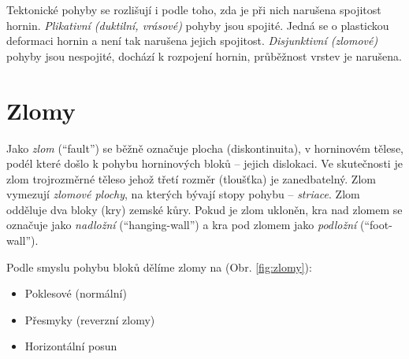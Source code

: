 Tektonické pohyby se rozlišují i podle toho, zda je při nich narušena spojitost hornin. \emph{Plikativní (duktilní, vrásové)} pohyby jsou spojité. Jedná se o plastickou deformaci hornin a není tak narušena jejich spojitost. \emph{Disjunktivní (zlomové)} pohyby jsou nespojité, dochází k rozpojení hornin, průběžnost vrstev je narušena.

\section{Zlomy}
Jako \emph{zlom} (\enquote{fault}) se běžně označuje plocha (diskontinuita), v horninovém tělese, podél které došlo k pohybu horninových bloků -- jejich dislokaci. Ve skutečnosti je zlom trojrozměrné těleso jehož třetí rozměr (tloušťka) je zanedbatelný. Zlom vymezují \emph{zlomové plochy}, na kterých bývají stopy pohybu -- \emph{striace}. Zlom odděluje dva bloky (kry) zemské kůry. Pokud je zlom ukloněn, kra nad zlomem se označuje jako \emph{nadložní} (\enquote{hanging-wall}) a kra pod zlomem jako \emph{podložní} (\enquote{foot-wall}).

Podle smyslu pohybu bloků dělíme zlomy na (Obr. \ref{fig:zlomy}):
\begin{itemize}
	\item Poklesové (normální)
	\item Přesmyky (reverzní zlomy)
	\item Horizontální posun
\end{itemize}

